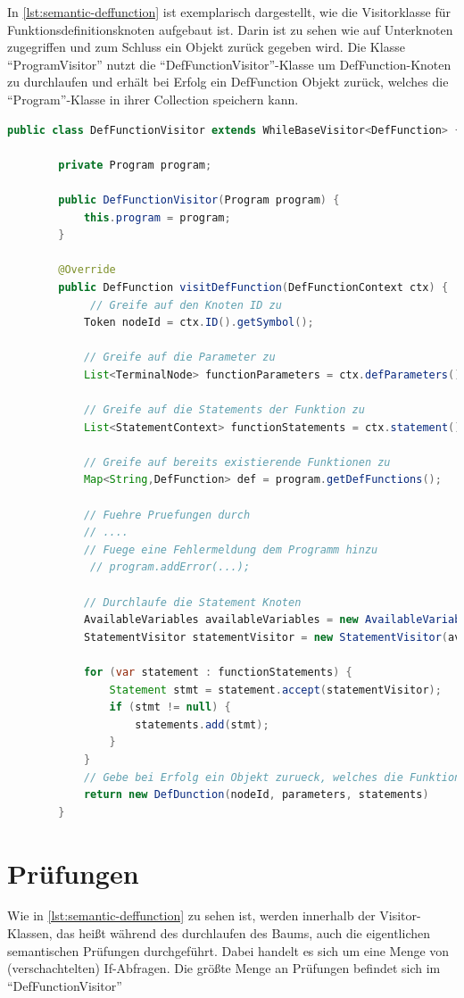 In \cref{lst:semantic-deffunction} ist exemplarisch dargestellt, wie die Visitorklasse für Funktionsdefinitionsknoten aufgebaut ist. Darin ist zu sehen wie auf Unterknoten zugegriffen und zum Schluss ein Objekt zurück gegeben wird. Die Klasse \enquote{ProgramVisitor} nutzt die \enquote{DefFunctionVisitor}-Klasse um DefFunction-Knoten zu durchlaufen und erhält bei Erfolg ein DefFunction Objekt zurück, welches die \enquote{Program}-Klasse in ihrer Collection speichern kann.

\begin{lstlisting}[language=java, caption=Prinzipieller Aufbau einer Visitorklasse, label={lst:semantic-deffunction}]
	public class DefFunctionVisitor extends WhileBaseVisitor<DefFunction> {
		
		private Program program;
		
		public DefFunctionVisitor(Program program) {
			this.program = program;
		}
		
		@Override
		public DefFunction visitDefFunction(DefFunctionContext ctx) {
			 // Greife auf den Knoten ID zu
			Token nodeId = ctx.ID().getSymbol();
			
			// Greife auf die Parameter zu
			List<TerminalNode> functionParameters = ctx.defParameters().ID();
			
			// Greife auf die Statements der Funktion zu
			List<StatementContext> functionStatements = ctx.statement(); 
			
			// Greife auf bereits existierende Funktionen zu
			Map<String,DefFunction> def = program.getDefFunctions();
			
			// Fuehre Pruefungen durch
			// ....
			// Fuege eine Fehlermeldung dem Programm hinzu 
			 // program.addError(...);
			
			// Durchlaufe die Statement Knoten
			AvailableVariables availableVariables = new AvailableVariables();
			StatementVisitor statementVisitor = new StatementVisitor(availableVariables, programm);
			
			for (var statement : functionStatements) {
				Statement stmt = statement.accept(statementVisitor);
				if (stmt != null) {
					statements.add(stmt);
				}
			}
			// Gebe bei Erfolg ein Objekt zurueck, welches die Funktion abbildet
			return new DefDunction(nodeId, parameters, statements)
		}
\end{lstlisting}

\section{Prüfungen}
Wie in \cref{lst:semantic-deffunction} zu sehen ist, werden innerhalb der Visitor-Klassen, das heißt während des durchlaufen des Baums, auch die eigentlichen semantischen Prüfungen durchgeführt. Dabei handelt es sich um eine Menge von (verschachtelten) If-Abfragen. Die größte Menge an Prüfungen befindet sich im \enquote{DefFunctionVisitor} 
